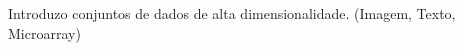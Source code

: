 %

 Introduzo conjuntos de dados de alta dimensionalidade. (Imagem, Texto, Microarray)
















